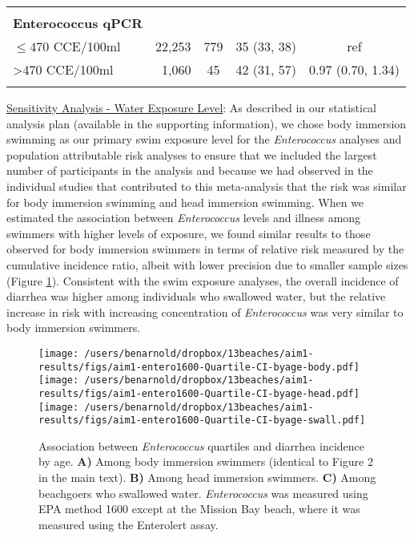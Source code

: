 \documentclass[12pt]{article}\usepackage[]{graphicx}\usepackage[]{color}
\begin{document}
\begin{table}[h!tb]
\begin{center}
\begin{footnotesize}
\begin{tabular}{l rc c c}
& \\
\textbf{Enterococcus qPCR} \\
 $\leq470$ CCE/100ml & 22,253 &    779 & 35 (33, 38) & ref \\ 
  >470 CCE/100ml &  1,060 &     45 & 42 (31, 57) & 0.97 (0.70, 1.34) \\ 
  
& \\
\hline
\end{tabular}
\end{footnotesize}
\end{center}
\end{table}



\clearpage
\underline{Sensitivity Analysis - Water Exposure Level}: As described in our statistical analysis plan (available in the supporting information), we chose body immersion swimming as our primary swim exposure level for the \emph{Enterococcus} analyses and population attributable risk analyses to ensure that we included the largest number of participants in the analysis and because we had observed in the individual studies that contributed to this meta-analysis that the risk was similar for body immersion swimming and head immersion swimming. When we estimated the association between \emph{Enterococcus} levels and illness among swimmers with higher levels of exposure, we found similar results to those observed for body immersion swimmers in terms of relative risk measured by the cumulative incidence ratio, albeit with lower precision due to smaller sample sizes (Figure \ref{fig:enterosens}). Consistent with the swim exposure analyses, the overall incidence of diarrhea was higher among individuals who swallowed water, but the relative increase in risk with increasing concentration of \emph{Enterococcus} was very similar to body immersion swimmers.

\begin{figure}[h!tb]
\begin{center}
\texttt{[image: /users/benarnold/dropbox/13beaches/aim1-results/figs/aim1-entero1600-Quartile-CI-byage-body.pdf]} \\
\texttt{[image: /users/benarnold/dropbox/13beaches/aim1-results/figs/aim1-entero1600-Quartile-CI-byage-head.pdf]} \\
\texttt{[image: /users/benarnold/dropbox/13beaches/aim1-results/figs/aim1-entero1600-Quartile-CI-byage-swall.pdf]}
\caption{Association between \emph{Enterococcus} quartiles and diarrhea incidence by age. \textbf{A)} Among body immersion swimmers (identical to Figure 2 in the main text). \textbf{B)} Among head immersion swimmers. \textbf{C)} Among beachgoers who swallowed water. \emph{Enterococcus} was measured using EPA method 1600 except at the Mission Bay beach, where it was measured using the Enterolert assay. \label{fig:enterosens}}
\end{center}
\end{figure}
\end{document}
